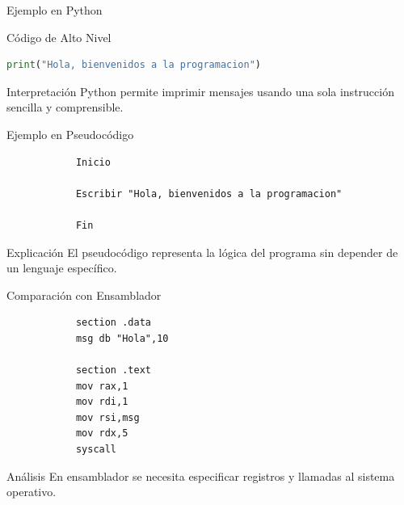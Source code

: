 \documentclass[10pt, aspectratio=169]{beamer}
\begin{document}
	\begin{frame}[fragile]{Ejemplo en Python}
		
		\begin{block}{Código de Alto Nivel}
		\end{block}
		
		\begin{lstlisting}[language=Python]
			print("Hola, bienvenidos a la programacion")
		\end{lstlisting}
		
		\vspace{0.5cm}
		
		\begin{block}{Interpretación}
			Python permite imprimir mensajes usando una sola instrucción sencilla y comprensible.
		\end{block}
		
	\end{frame}
	
	\begin{frame}[fragile]{Ejemplo en Pseudocódigo}
		
		\begin{lstlisting}
			Inicio
			
			Escribir "Hola, bienvenidos a la programacion"
			
			Fin
		\end{lstlisting}
		
		\vspace{0.5cm}
		
		\begin{block}{Explicación}
			El pseudocódigo representa la lógica del programa sin depender de un lenguaje específico.
		\end{block}
		
	\end{frame}
	
	\begin{frame}[fragile]{Comparación con Ensamblador}
		
		\begin{lstlisting}
			section .data
			msg db "Hola",10
			
			section .text
			mov rax,1
			mov rdi,1
			mov rsi,msg
			mov rdx,5
			syscall
		\end{lstlisting}
		
		\vspace{0.4cm}
		
		\begin{block}{Análisis}
			En ensamblador se necesita especificar registros y llamadas al sistema operativo.
		\end{block}
		
	\end{frame}
	
\end{document}
